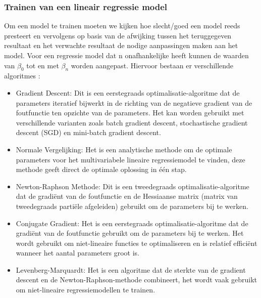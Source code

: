 {\subsubsection{Trainen van een lineair regressie model}
Om een model te trainen moeten we kijken hoe slecht/goed een model reeds presteert en vervolgens op basis van de afwijking tussen het teruggegeven resultaat en het verwachte resultaat de nodige aanpassingen maken aan het model. Voor een regressie model dat n onafhankelijke heeft kunnen de waarden van \(\beta_0\) tot en met \(\beta_n\) worden aangepast. Hiervoor bestaan er verschillende algoritmes :
\begin{itemize}
   \item Gradient Descent: Dit is een eerstegraads optimalisatie-algoritme dat de parameters iteratief bijwerkt in de richting van de negatieve gradient van de foutfunctie ten opzichte van de parameters. Het kan worden gebruikt met verschillende varianten zoals batch gradient descent, stochastische gradient descent (SGD) en mini-batch gradient descent.
   
   \item Normale Vergelijking: Het is een analytische methode om de optimale parameters voor het multivariabele lineaire regressiemodel te vinden, deze methode geeft direct de optimale oplossing in één stap.
   
   \item Newton-Raphson Methode: Dit is een tweedegraads optimalisatie-algoritme dat de gradiënt  van de foutfunctie en de Hessiaanse matrix (matrix van tweedegraads partiële afgeleiden) gebruikt om de parameters bij te werken.
   
   \item Conjugate Gradient: Het is een eerstegraads optimalisatie-algoritme dat de gradiënt van de foutfunctie gebruikt om de parameters bij te werken. Het wordt gebruikt om niet-lineaire functies te optimaliseren en is relatief efficiënt wanneer het aantal parameters groot is.
   
   \item Levenberg-Marquardt: Het is een algoritme dat de sterkte van de gradient descent en de Newton-Raphson-methode combineert, het wordt vaak gebruikt om niet-lineaire regressiemodellen te trainen.    
\end{itemize}
\autocite{Maulud2020}
}
